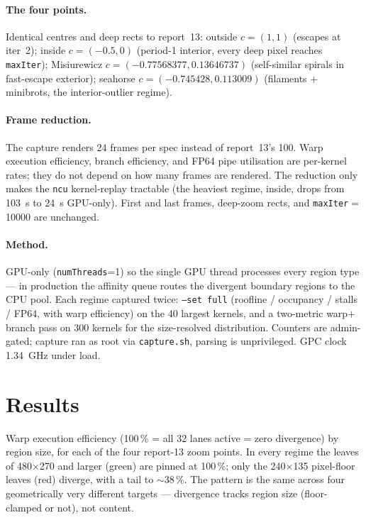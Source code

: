 \documentclass[
	english,
	letterpaper, oneside
]{article}
\begin{document}
\paragraph{The four points.} Identical centres and deep rects to report~13:
outside $c\!=\!(1,1)$ (escapes at iter~2); inside $c\!=\!(-0.5,0)$ (period-1
interior, every deep pixel reaches \texttt{maxIter}); Misiurewicz
$c\!=\!(-0.77568377,0.13646737)$ (self-similar spirals in fast-escape exterior);
seahorse $c\!=\!(-0.745428,0.113009)$ (filaments + minibrots, the interior-outlier
regime).

\paragraph{Frame reduction.} The capture renders 24 frames per spec
instead of report~13's 100. Warp execution efficiency, branch efficiency, and
FP64 pipe utilisation are per-kernel rates; they do not depend on how many
frames are rendered. The reduction only makes the \texttt{ncu} kernel-replay
tractable (the heaviest regime, inside, drops from 103~s to 24~s GPU-only). First
and last frames, deep-zoom rects, and \texttt{maxIter}$=$10000 are unchanged.

\paragraph{Method.} GPU-only (\texttt{numThreads}=1) so the single GPU thread
processes every region type --- in production the affinity queue routes the
divergent boundary regions to the CPU pool. Each regime captured twice: \texttt{--set
full} (roofline / occupancy / stalls / FP64, with warp efficiency) on the 40
largest kernels, and a two-metric warp$+$branch pass on 300 kernels for the
size-resolved distribution. Counters are admin-gated; capture ran as root via
\texttt{capture.sh}, parsing is unprivileged. GPC clock 1.34~GHz under load.

\section{Results}

            {Warp execution efficiency (100\,\% = all 32 lanes active = zero
             divergence) by region size, for each of the four report-13 zoom
             points. In every regime the leaves of 480$\times$270 and
             larger (green) are pinned at 100\,\%; only the 240$\times$135
             pixel-floor leaves (red) diverge, with a tail to $\sim$38\,\%.
             The pattern is the same across four geometrically very different
             targets --- divergence tracks region size (floor-clamped or
             not), not content. \label{fig:zoom}}
\end{document}
